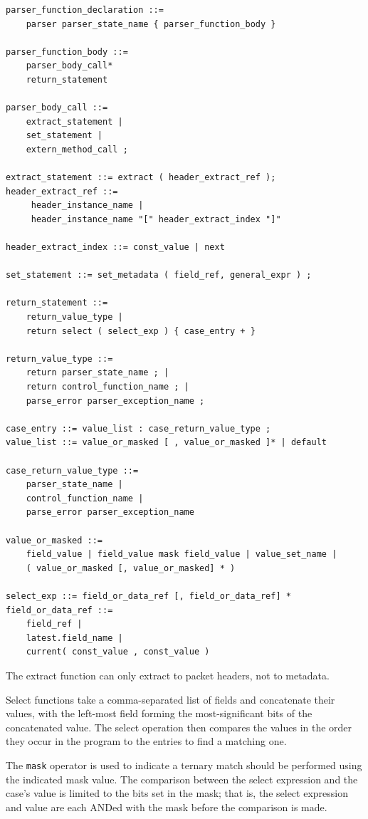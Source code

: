 \documentclass[12pt]{article}
\begin{document}
\begin{lstlisting}[style=BNFstyle]
parser_function_declaration ::=
    parser parser_state_name { parser_function_body }

parser_function_body ::=
    parser_body_call*
    return_statement

parser_body_call ::=
    extract_statement |
    set_statement |
    extern_method_call ;

extract_statement ::= extract ( header_extract_ref ); 
header_extract_ref ::=
     header_instance_name |
     header_instance_name "[" header_extract_index "]"

header_extract_index ::= const_value | next

set_statement ::= set_metadata ( field_ref, general_expr ) ;

return_statement ::=
    return_value_type |
    return select ( select_exp ) { case_entry + }

return_value_type ::= 
    return parser_state_name ; | 
    return control_function_name ; | 
    parse_error parser_exception_name ;

case_entry ::= value_list : case_return_value_type ;
value_list ::= value_or_masked [ , value_or_masked ]* | default

case_return_value_type ::= 
    parser_state_name | 
    control_function_name | 
    parse_error parser_exception_name

value_or_masked ::=
    field_value | field_value mask field_value | value_set_name |
    ( value_or_masked [, value_or_masked] * )
 
select_exp ::= field_or_data_ref [, field_or_data_ref] * 
field_or_data_ref ::=
    field_ref |
    latest.field_name |
    current( const_value , const_value )
\end{lstlisting}

The extract function can only extract to packet headers, not to metadata.

Select functions take a comma-separated list of fields and concatenate their 
values, with the left-most field forming the most-significant bits of the 
concatenated value.  The select operation then compares the values in the 
order they occur in the program to the entries to find a matching one.

The \texttt{mask} operator is used to indicate a ternary match should be performed 
using the indicated mask value. The comparison between the select expression 
and the case's value is limited to the bits set in the mask; that is, the 
select expression and value are each ANDed with the mask before the comparison 
is made. 
\end{document}
